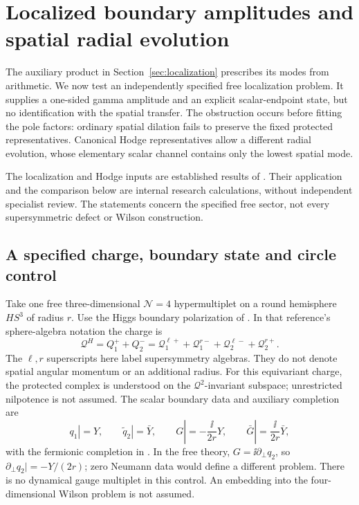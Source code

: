 \section{Localized boundary amplitudes and spatial radial evolution}
\label{sec:localized-response}

The auxiliary product in Section~\ref{sec:localization} prescribes its
modes from arithmetic. We now test an independently specified free
localization problem. It supplies a one-sided gamma amplitude and an
explicit scalar-endpoint state, but no identification with the spatial
transfer. The obstruction occurs before fitting the pole factors:
ordinary spatial dilation fails to preserve the fixed protected
representatives. Canonical Hodge representatives allow a different
radial evolution, whose elementary scalar channel contains only the
lowest spatial mode.

The localization and Hodge inputs are established results of
\cite{DPYHiggs,DedushenkoGluing}. Their application and the comparison
below are internal research calculations, without independent
specialist review. The statements concern the specified free sector,
not every supersymmetric defect or Wilson construction.

\subsection{A specified charge, boundary state and circle control}
\label{subsec:localized-boundary}

Take one free three-dimensional $\mathcal N=4$ hypermultiplet on a
round hemisphere $HS^3$ of radius $r$. Use the Higgs boundary
polarization of \cite[Sections~4.2 and 4.3.2]{DedushenkoGluing}.
In that reference's sphere-algebra notation the charge is
\begin{equation}\label{eq:localized-charge}
 \mathcal Q^H=Q_1^++Q_2^-
 =\mathcal Q_1^{\ell+}+\mathcal Q_1^{r-}
  +\mathcal Q_2^{\ell-}+\mathcal Q_2^{r+}.
\end{equation}
The $\ell,r$ superscripts here label supersymmetry algebras. They do
not denote spatial angular momentum or an additional radius.
For this equivariant charge, the protected complex is understood on
the $\mathcal Q^2$-invariant subspace; unrestricted nilpotence is not
assumed.
The scalar boundary data and auxiliary completion are
\begin{equation}\label{eq:localized-boundary-data}
 q_1|=Y,\qquad \widetilde q_2|=\bar Y,\qquad
 G|=-\frac{\ii}{2r}Y,\qquad
 \bar G|=\frac{\ii}{2r}\bar Y,
\end{equation}
with the fermionic completion in
\cite[equations~(80)--(82)]{DedushenkoGluing}. In the free theory,
$G=\ii\partial_\perp q_2$, so
$\partial_\perp q_2|=-Y/(2r)$; zero Neumann data would define a
different problem. There is no dynamical gauge multiplet in this
control. An embedding into the four-dimensional Wilson problem is
not assumed.

